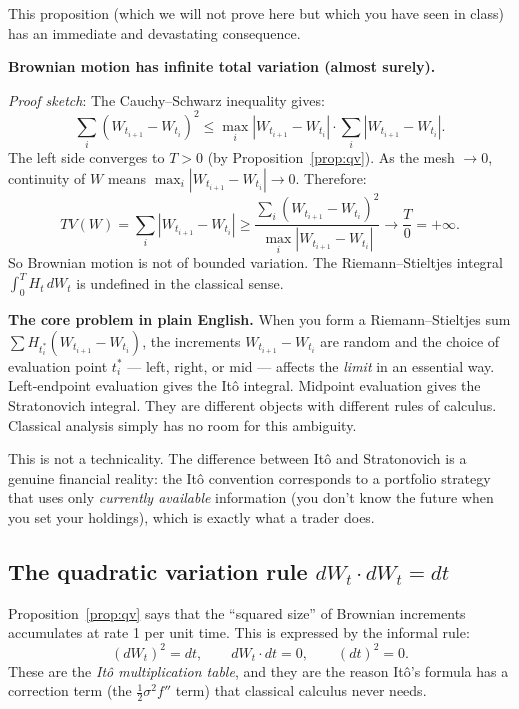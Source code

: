 \documentclass[11pt,a4paper]{article}
\theoremstyle{definition}
\theoremstyle{plain}
\theoremstyle{remark}
\newcommand{\abs}[1]{\left|#1\right|}
\begin{document}
This proposition (which we will not prove here but which you have seen in class) has an immediate and devastating consequence.

\begin{pitfall}
\textbf{Brownian motion has infinite total variation (almost surely).}

\emph{Proof sketch}: The Cauchy--Schwarz inequality gives:
\[
  \sum_i (W_{t_{i+1}} - W_{t_i})^2 \leq \max_i \abs{W_{t_{i+1}} - W_{t_i}} \cdot \sum_i \abs{W_{t_{i+1}} - W_{t_i}}.
\]
The left side converges to $T > 0$ (by Proposition~\ref{prop:qv}). As the mesh $\to 0$, continuity of $W$ means $\max_i \abs{W_{t_{i+1}} - W_{t_i}} \to 0$. Therefore:
\[
  TV(W) = \sum_i \abs{W_{t_{i+1}} - W_{t_i}} \geq \frac{\sum_i (W_{t_{i+1}}-W_{t_i})^2}{\max_i \abs{W_{t_{i+1}}-W_{t_i}}} \to \frac{T}{0} = +\infty.
\]
So Brownian motion is not of bounded variation. The Riemann--Stieltjes integral $\int_0^T H_t\,dW_t$ is undefined in the classical sense.
\end{pitfall}

\begin{tutobox}
\textbf{The core problem in plain English.}
When you form a Riemann--Stieltjes sum $\sum H_{t_i^*}(W_{t_{i+1}} - W_{t_i})$, the increments $W_{t_{i+1}} - W_{t_i}$ are random and the choice of evaluation point $t_i^*$ --- left, right, or mid --- affects the \emph{limit} in an essential way. Left-endpoint evaluation gives the Itô integral. Midpoint evaluation gives the Stratonovich integral. They are different objects with different rules of calculus. Classical analysis simply has no room for this ambiguity.

This is not a technicality. The difference between Itô and Stratonovich is a genuine financial reality: the Itô convention corresponds to a portfolio strategy that uses only \emph{currently available} information (you don't know the future when you set your holdings), which is exactly what a trader does.
\end{tutobox}

\subsection{The quadratic variation rule $dW_t \cdot dW_t = dt$}

Proposition~\ref{prop:qv} says that the ``squared size'' of Brownian increments accumulates at rate 1 per unit time. This is expressed by the informal rule:
\[
  (dW_t)^2 = dt, \qquad dW_t\cdot dt = 0, \qquad (dt)^2 = 0.
\]
These are the \emph{Itô multiplication table}, and they are the reason Itô's formula has a correction term (the $\frac{1}{2}\sigma^2 f''$ term) that classical calculus never needs.
\end{document}
